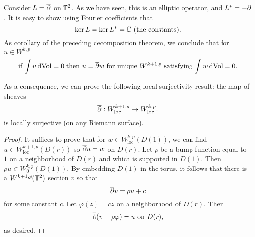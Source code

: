  
 \begin{example}
   Consider $L=\overline{\partial}$ on $\mathbb{T}^{2}$. As we have seen, this is an
   elliptic operator, and $L^{*}=-\partial$. It is easy to show using
   Fourier coefficients that
   \begin{equation*}
     \ker L=\ker L^{*}=\mathbb{C}\text{ (the constants)}.
   \end{equation*}
   As corollary of the preceding decomposition theorem, we conclude
   that for $u\in W^{k,p}$
   \begin{equation*}
     \text{if $\int u\,\mathrm{dVol}=0$ then $u=\overline{\partial} w$ for unique $W^{k+1,p}$ satisfying
       $\int w\, \mathrm{dVol}=0$}.
   \end{equation*}
   
   As a consequence, we can prove the following local surjectivity
   result: the map of sheaves
   \begin{equation*}
     \overline{\partial}:W^{k+1,p}_{\text{loc}}\to W^{k,p}_{\text{loc}}.
   \end{equation*}
   is locally surjective (on any Riemann surface).

   \begin{proof}
     It suffices to prove that for $w\in W^{k,p}_{\text{loc}}(D(1))$,
     we can find $u\in W^{k+1,p}_{\text{loc}}(D(r))$ so $\overline{\partial} u=w$
     on $D(r)$. Let $\rho$ be a bump function equal to $1$ on a
     neighborhood of $D(r)$ and which is supported in $D(1)$. Then
     $\rho u\in W^{k,p}_{0}(D(1))$. By embedding $D(1)$ in the torus,
     it follows that there is a $W^{k+1,p}(\mathbb{T}^{2})$ section $v$ so
     that
     \begin{equation*}
       \overline{\partial} v=\rho u+c
     \end{equation*}
     for some constant $c$. Let $\varphi(z)=cz$ on a neighborhood of
     $D(r)$. Then
     \begin{equation*}
       \overline{\partial}(v-\rho \varphi)=u\text{ on $D(r)$},
     \end{equation*}
     as desired.    
   \end{proof}  
 \end{example}
